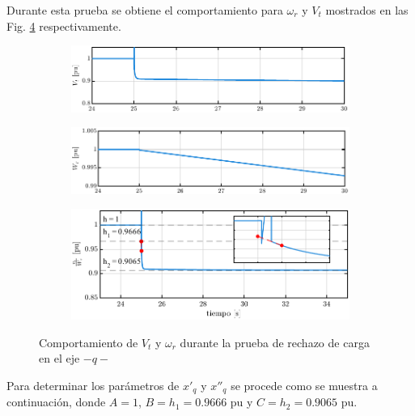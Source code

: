 \documentclass[conference]{IEEEtran}
\begin{document}
Durante esta prueba se obtiene el comportamiento para $\omega_r$ y $V_t$ mostrados en las Fig. \ref{fig:subfigs} respectivamente.

\begin{figure}[ht]
    \centering
    \begin{subfigure}
        \centering
        \includegraphics[width=\linewidth]{Fig/fig3.pdf}
        \label{fig:fig3}
    \end{subfigure}
    \hfill
    \begin{subfigure}
        \centering
        \includegraphics[width=\linewidth]{Fig/fig4.pdf}
        \label{fig:fig4}
    \end{subfigure}
    \hfill
    \begin{subfigure}
        \centering
        \includegraphics[width=\linewidth]{Fig/fig5.pdf}
        
        \label{fig:fig5}
    \end{subfigure}
    \caption{Comportamiento de $V_t$ y $\omega_r$ durante la prueba de rechazo de carga en el eje $-q-$}
    \label{fig:subfigs}
\end{figure}

Para determinar los parámetros de $x'_q$ y $x''_q$ se procede como se muestra a continuación, donde
$A=1$, $B=h_1=0.9666\text{ pu}$ y $C=h_2=0.9065\text{ pu}$.
\end{document}
